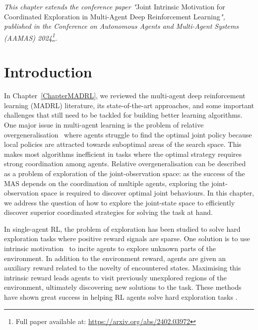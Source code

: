 

\label{ChapterJIM} 

\textit{This chapter extends the conference paper "}Joint Intrinsic Motivation for Coordinated Exploration in Multi-Agent Deep Reinforcement Learning\textit{", published in the Conference on Autonomous Agents and Multi-Agent Systems (AAMAS) 2024\footnote{Full paper available at: \url{https://arxiv.org/abs/2402.03972}}.}


\section{Introduction}


In Chapter~\ref{ChapterMADRL}, we reviewed the multi-agent deep reinforcement learning (MADRL) literature, its state-of-the-art approaches, and some important challenges that still need to be tackled for building better learning algorithms. 
One major issue in multi-agent learning is the problem of relative overgeneralisation~\citep{Wiegand2003_RelOvergen, Wei2016_RelOvergen} where agents struggle to find the optimal joint policy because local policies are attracted towards suboptimal areas of the search space. This makes most algorithms inefficient in tasks where the optimal strategy requires strong coordination among agents. Relative overgeneralisation can be described as a problem of exploration of the joint-observation space: as the success of the MAS depends on the coordination of multiple agents, exploring the joint-observation space is required to discover optimal joint behaviours. In this chapter, we address the question of how to explore the joint-state space to efficiently discover superior coordinated strategies for solving the task at hand. 

In single-agent RL, the problem of exploration has been studied to solve hard exploration tasks where positive reward signals are sparse. One solution is to use intrinsic motivation~\citep{Schmidhuber1991, Oudeyer2007_IntrMotiv, lehman2011abandoning} to incite agents to explore unknown parts of the environment. In addition to the environment reward, agents are given an auxiliary reward related to the novelty of encountered states. Maximising this intrinsic reward leads agents to visit previously unexplored regions of the environment, ultimately discovering new solutions to the task. These methods have shown great success in helping RL agents solve hard exploration tasks \citep{Pathak2017_ICM, Badia2020_NGU}. 


